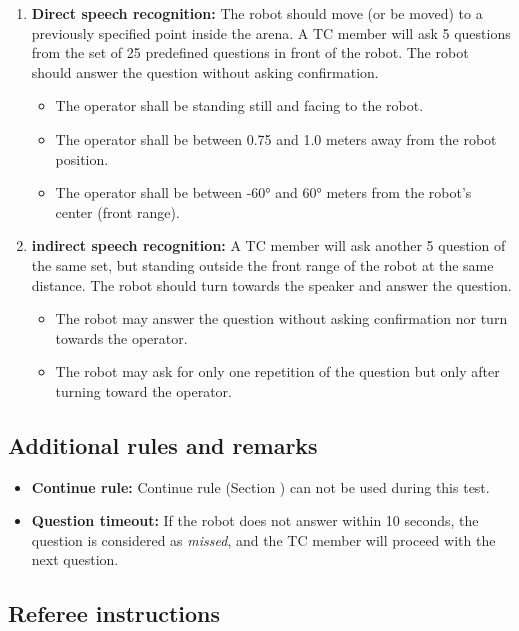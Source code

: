 \begin{enumerate}
\item \textbf{Direct speech recognition: } The robot should move (or be moved) to a previously specified point inside the arena. A TC member will ask 5 questions from the set of 25 predefined questions in front of the robot. The robot should answer the question without asking confirmation.
\begin{itemize}
\item The operator shall be standing still and facing to the robot.
\item The operator shall be between 0.75 and 1.0 meters away from the robot position.
\item The operator shall be between -60° and 60° meters from the robot's center (front range).
\end{itemize}
\item \textbf{indirect speech recognition: } A TC member will ask another 5 question of the same set, but standing outside the front range of the robot at the same distance. The robot should turn towards the speaker and answer the question.
\begin{itemize}
\item The robot may answer the question without asking confirmation nor turn towards the operator.
\item The robot may ask for only one repetition of the question but only after turning toward the operator.
\end{itemize}
\end{enumerate}


\subsection{Additional rules and remarks}

\begin{itemize}
\item \textbf{Continue rule:} Continue rule (Section ) can not be used during this test.
\item \textbf{Question timeout:} If the robot does not answer within 10 seconds, the question is considered as \textit{missed}, and the TC member will proceed with the next question.
\end{itemize}

\subsection{Referee instructions}

